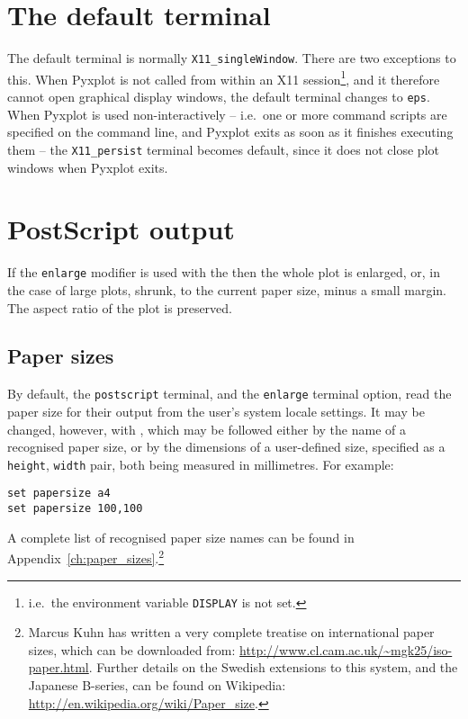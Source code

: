 \section{The default terminal}

The default terminal is normally {\tt X11\_singleWindow}. There are two
exceptions to this.  When Pyxplot is not called from within an X11
session\footnote{i.e.\ the environment variable {\tt DISPLAY} is not set.}, and
it therefore cannot open graphical display windows, the default terminal
changes to {\tt eps}.  When Pyxplot is used non-interactively -- i.e.\ one or
more command scripts are specified on the command line, and Pyxplot exits as
soon as it finishes executing them -- the {\tt X11\_persist} terminal becomes
default, since it does not close plot windows when Pyxplot exits.

\section{PostScript output}

If the {\tt enlarge} modifier is used with the  then the
whole plot is enlarged, or, in the case of large plots, shrunk, to the current
paper size, minus a small margin. The aspect ratio of the plot is preserved.

\subsection{Paper sizes}
\label{sec:set_papersize}

By default, the {\tt postscript} terminal, and the {\tt enlarge} terminal
option, read the paper size for their output from the user's system locale
settings. It may be changed, however, with , which may
be followed either by the name of a recognised paper size, or by the dimensions
of a user-defined size, specified as a {\tt height}, {\tt width} pair, both
being measured in millimetres. For example:

\begin{verbatim}
set papersize a4
set papersize 100,100
\end{verbatim}

\noindent A complete list of recognised paper size names can be found in
Appendix~\ref{ch:paper_sizes}.\footnote{Marcus Kuhn has written a very complete
treatise on international paper sizes, which can be downloaded from:
\url{http://www.cl.cam.ac.uk/~mgk25/iso-paper.html}. Further details on the
Swedish extensions to this system, and the Japanese B-series, can be found on
Wikipedia: \url{http://en.wikipedia.org/wiki/Paper_size}.}

